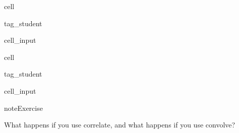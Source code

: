 \documentclass[letterpaper,10pt,english]{jupyterBook}
\begin{document}
\begin{sphinxuseclass}{cell}
\begin{sphinxuseclass}{tag_student}\begin{sphinxVerbatimInput}

\begin{sphinxuseclass}{cell_input}
\begin{sphinxVerbatim}[commandchars=\\\{\}]
\end{sphinxVerbatim}

\end{sphinxuseclass}\end{sphinxVerbatimInput}

\end{sphinxuseclass}
\end{sphinxuseclass}

\begin{sphinxuseclass}{cell}
\begin{sphinxuseclass}{tag_student}\begin{sphinxVerbatimInput}

\begin{sphinxuseclass}{cell_input}
\begin{sphinxVerbatim}[commandchars=\\\{\}]
\end{sphinxVerbatim}

\end{sphinxuseclass}\end{sphinxVerbatimInput}

\end{sphinxuseclass}
\end{sphinxuseclass}
\begin{sphinxadmonition}{note}{Exercise}

\sphinxAtStartPar
What happens if you use correlate, and what happens if you use convolve?
\end{sphinxadmonition}
\end{document}
